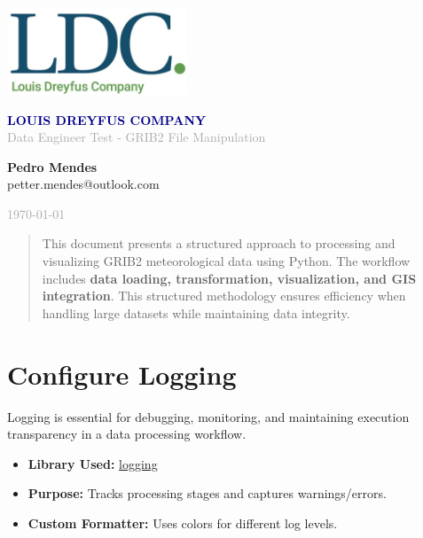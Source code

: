 \documentclass[a4paper,10pt]{article}
\begin{document}
\begin{titlepage}
    \centering
    \includegraphics[width=0.4\textwidth]{dreyfus_logo.jpg}

    \vspace{2cm}
    {\LARGE\textbf{\textcolor{darkblue}{LOUIS DREYFUS COMPANY}}} \\
    \vspace{0.5cm}
    {\Large\textcolor{darkgray}{Data Engineer Test - GRIB2 File Manipulation}}

    \vfill
    {\LARGE \sffamily \textbf{Pedro Mendes}} \\
    {\large petter.mendes@outlook.com}
    

    \vspace{1.5cm}
    {\large \textcolor{darkgray}{\today}}
\end{titlepage}

\begin{abstract}
This document presents a structured approach to processing and visualizing GRIB2 meteorological data using Python. The workflow includes \textbf{data loading, transformation, visualization, and GIS integration}. This structured methodology ensures efficiency when handling large datasets while maintaining data integrity.
\end{abstract}

\section{Configure Logging}
Logging is essential for debugging, monitoring, and maintaining execution transparency in a data processing workflow.

\begin{itemize}
    \item \textbf{Library Used:} \href{https://docs.python.org/3/library/logging.html}{logging}
    \item \textbf{Purpose:} Tracks processing stages and captures warnings/errors.
    \item \textbf{Custom Formatter:} Uses colors for different log levels.
\end{itemize}
\end{document}
